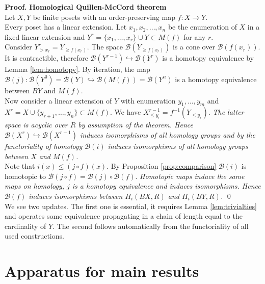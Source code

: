 \documentclass[english,12pt]{article}
\numberwithin{equation}{section}
\theoremstyle{definition}
\theoremstyle{remark}
\newenvironment{pf}{\noindent\textbf{Proof.}}{\qed}
\renewcommand{\leq}{\leqslant}
\renewcommand{\geq}{\geqslant}
\begin{document}
\begin{pf} \textbf{Homological Quillen-McCord theorem}\\
Let $X, Y$ be finite posets with an order-preserving map $f : X \to Y$.\\

Every poset has a linear extension. Let $x_1, x_2, \ldots, x_n$ be the enumeration of $X$ in a fixed linear extension and $Y^r = \{x_1,\ldots,x_r\} \cup Y \subset M(f)$ for any $r$.\\

Consider $Y^r_{>x_r} = Y_{\geq f(x_r)}$. The space $\mathcal{B}(Y_{\geq f(x_r)})$ is a cone over $\mathcal{B}(f(x_r))$. It is contractible, therefore $\mathcal{B}(Y^{r-1}) \hookrightarrow \mathcal{B}(Y^{r})$ is a homotopy equivalence by Lemma \ref{lem:homotopy}. By iteration, the map $\mathcal{B}(j) : \mathcal{B}(Y^{0}) = \mathcal{B}(Y) \hookrightarrow \mathcal{B}(M(f)) = \mathcal{B}(Y^n)$ is a homotopy equivalence between $BY$ and $M(f)$.\\

Now consider a linear extension of $Y$ with enumeration $y_1,\ldots,y_m$ and $X^r = X \cup \{y_{r+1},\ldots,y_n\} \subset M(f)$. We have $X^{r-1}_{\leq y_r} = f^{-1}(Y_{\leqslant y_r})$. \textit{The latter space is acyclic over $R$ by assumption of the theorem. Hence $\mathcal{B}(X^{r}) \hookrightarrow \mathcal{B}(X^{r-1})$ induces isomorphisms of all homology groups and by the functoriality of homology $\mathcal{B}(i)$ induces isomorphisms of all homology groups between $X$ and $M(f)$.}\\

Note that $i(x) \leqslant (j \circ f)(x)$. By Proposition \ref{prop:comparison} $\mathcal{B}(i)$ is homotopic to $\mathcal{B}(j \circ f) = \mathcal{B}(j) \circ \mathcal{B}(f)$. \textit{Homotopic maps induce the same maps on homology, $j$ is a homotopy equivalence and induces isomorphisms. Hence $\mathcal{B}(f)$ induces isomorphisms between $H_i(BX,R)$ and $H_i(BY,R)$.}
\end{pf}\\

We see two updates. The first one is essential, it requires Lemma \ref{lem:trivialties} and operates some equivalence propagating in a chain of length equal to the cardinality of $Y$. The second follows automatically from the functoriality of all used constructions.

\section{Apparatus for main results}
\end{document}
